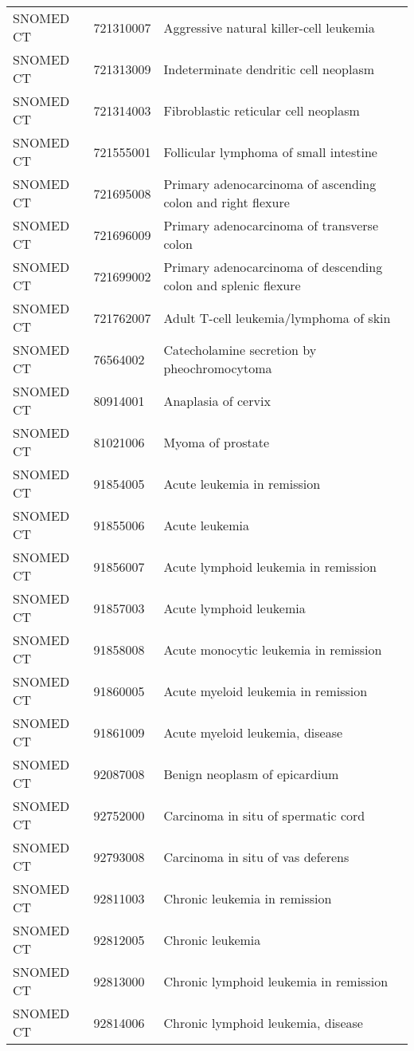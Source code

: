 \begin{longtable}{p{}p{}p{}}
  SNOMED CT & 721310007 & Aggressive natural killer-cell leukemia \\ 
  SNOMED CT & 721313009 & Indeterminate dendritic cell neoplasm \\ 
  SNOMED CT & 721314003 & Fibroblastic reticular cell neoplasm \\ 
  SNOMED CT & 721555001 & Follicular lymphoma of small intestine \\ 
  SNOMED CT & 721695008 & Primary adenocarcinoma of ascending colon and right flexure \\ 
  SNOMED CT & 721696009 & Primary adenocarcinoma of transverse colon \\ 
  SNOMED CT & 721699002 & Primary adenocarcinoma of descending colon and splenic flexure \\ 
  SNOMED CT & 721762007 & Adult T-cell leukemia/lymphoma of skin \\ 
  SNOMED CT & 76564002 & Catecholamine secretion by pheochromocytoma \\ 
  SNOMED CT & 80914001 & Anaplasia of cervix \\ 
  SNOMED CT & 81021006 & Myoma of prostate \\ 
  SNOMED CT & 91854005 & Acute leukemia in remission \\ 
  SNOMED CT & 91855006 & Acute leukemia \\ 
  SNOMED CT & 91856007 & Acute lymphoid leukemia in remission \\ 
  SNOMED CT & 91857003 & Acute lymphoid leukemia \\ 
  SNOMED CT & 91858008 & Acute monocytic leukemia in remission \\ 
  SNOMED CT & 91860005 & Acute myeloid leukemia in remission \\ 
  SNOMED CT & 91861009 & Acute myeloid leukemia, disease \\ 
  SNOMED CT & 92087008 & Benign neoplasm of epicardium \\ 
  SNOMED CT & 92752000 & Carcinoma in situ of spermatic cord \\ 
  SNOMED CT & 92793008 & Carcinoma in situ of vas deferens \\ 
  SNOMED CT & 92811003 & Chronic leukemia in remission \\ 
  SNOMED CT & 92812005 & Chronic leukemia \\ 
  SNOMED CT & 92813000 & Chronic lymphoid leukemia in remission \\ 
  SNOMED CT & 92814006 & Chronic lymphoid leukemia, disease \\ 

\end{longtable}

